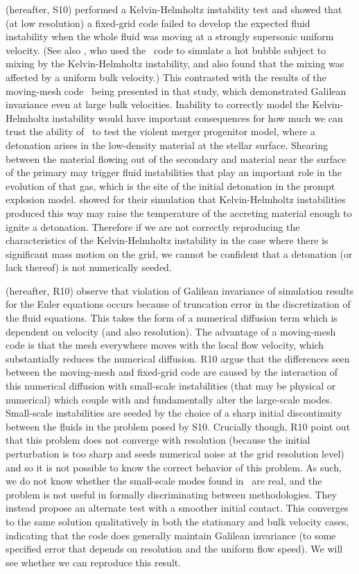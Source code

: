 \documentclass[12pt]{article}
\begin{document}
\citet{arepo} (hereafter, S10) performed a Kelvin-Helmholtz instability test and showed
that (at low resolution) a fixed-grid code failed to develop the
expected fluid instability when the whole fluid was moving at a
strongly supersonic uniform velocity. (See also \citet{wadsley:2008}, 
who used the \flash\ code to simulate a hot bubble subject to mixing 
by the Kelvin-Helmholtz instability, and also found that the mixing was affected by a 
uniform bulk velocity.) This contrasted with the results
of the moving-mesh code \arepo\ being presented in that study, which
demonstrated Galilean invariance even at large bulk velocities. 
Inability to correctly model the Kelvin-Helmholtz instability would 
have important consequences for how much we can trust the ability of 
\castro\ to test the violent merger progenitor model, where a detonation 
arises in the low-density material at the stellar surface. Shearing between 
the material flowing out of the secondary and material near the 
surface of the primary may trigger fluid
instabilities that play an important role in the evolution of that
gas, which is the site of the initial detonation in the prompt
explosion model. \citet{guillochon:2010} showed for their simulation
that Kelvin-Helmholtz instabilities produced this way may raise the
temperature of the accreting material enough to ignite a
detonation. Therefore if we are not correctly reproducing the
characteristics of the Kelvin-Helmholtz instability in the case where
there is significant mass motion on the grid, we cannot be confident
that a detonation (or lack thereof) is not numerically
seeded. 

\citet{robertson:2010} (hereafter, R10) observe that violation of Galilean
invariance of simulation results for the Euler equations occurs 
because of truncation error in the discretization of the fluid
equations. This takes the form of a numerical diffusion term which is
dependent on velocity (and also resolution). The advantage of a
moving-mesh code is that the mesh everywhere moves with the local flow
velocity, which substantially reduces the numerical
diffusion. R10 argue that the differences seen
between the moving-mesh and fixed-grid code are caused by the
interaction of this numerical diffusion with small-scale instabilities
(that may be physical or numerical) which couple with and
fundamentally alter the large-scale modes. Small-scale instabilities
are seeded by the choice of a sharp initial discontinuity between the 
fluids in the problem posed by S10. Crucially though,
R10 point out that this problem does not
converge with resolution (because the initial perturbation is too sharp 
and seeds numerical noise at the grid resolution level) 
and so it is not possible to know the correct
behavior of this problem. As such, we do not know whether the
small-scale modes found in \arepo\ are real, and the problem is not
useful in formally discriminating between methodologies. They instead
propose an alternate test with a smoother initial contact. This
converges to the same solution qualitatively in both the stationary
and bulk velocity cases, indicating that the code does generally
maintain Galilean invariance (to some specified error that depends on
resolution and the uniform flow speed).  We will see whether we can
reproduce this result.
\end{document}
